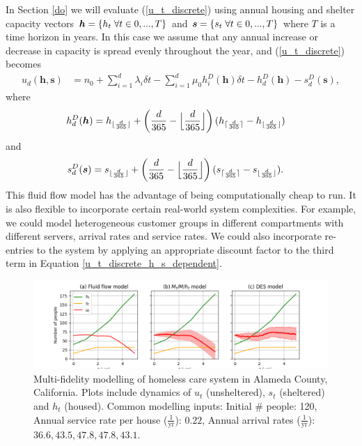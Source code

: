 \documentclass[12pt,a4paper]{article}
\begin{document}
In Section \ref{do} we will evaluate (\ref{u_t_discrete}) using annual housing and shelter capacity vectors $\boldsymbol{h} = \{h_t \hspace{0.1cm} \forall t \in 0,...,T\}$ and $\boldsymbol{s} = \{s_t \hspace{0.1cm} \forall t \in 0,...,T\}$ where $T$ is a time horizon in years. In this case we assume that any annual increase or decrease in capacity is spread evenly throughout the year, and (\ref{u_t_discrete}) becomes
%
\begin{align} \label{u_t_discrete_h_s_dependent}
u_d(\boldsymbol{h},\boldsymbol{s}) & = n_0 + \sum_{i=1}^{d} \lambda_{i} \delta t - \sum_{i=1}^{d} \mu_0 h^D_{i}(\boldsymbol{h}) \delta t - h^D_d(\boldsymbol{h}) - s^D_d(\boldsymbol{s}),
\end{align}
%
where 
%
\begin{align} \label{h_d}
h^D_d(\boldsymbol{h}) & = h_{\lfloor{\frac{d}{365}}\rfloor} + \left( \frac{d}{365} - \Bigl\lfloor\frac{d}{365}\Bigr\rfloor \right)(h_{\lceil{\frac{d}{365}}\rceil}-h_{\lfloor{\frac{d}{365}}\rfloor})
\end{align}
%
and
%
\begin{align} \label{s_d}
s^D_d(\boldsymbol{s}) & = s_{\lfloor{\frac{d}{365}}\rfloor} + \left( \frac{d}{365} - \Bigl\lfloor\frac{d}{365}\Bigr\rfloor \right)(s_{\lceil{\frac{d}{365}}\rceil}-s_{\lfloor{\frac{d}{365}}\rfloor}).
\end{align}
%
This fluid flow model has the advantage of being computationally cheap to run. It is also flexible to incorporate certain real-world system complexities. For example, we could model heterogeneous customer groups in different compartments with different servers, arrival rates and service rates. We could also incorporate re-entries to the system by applying an appropriate discount factor to the third term in Equation \ref{u_t_discrete_h_s_dependent}.
%
\begin{figure}[h!]%
    \centering
    \includegraphics[scale=0.7]{u_t_example.png}
    \caption{Multi-fidelity modelling of homeless care system in Alameda County, California. Plots include dynamics of $u_t$ (unsheltered), $s_t$ (sheltered) and $h_t$ (housed). Common modelling inputs: Initial \# people: 120, Annual service rate per house ($\frac{1}{\text{yr}}$): $0.22$, Annual arrival rates ($\frac{1}{\text{yr}}$): $36.6, 43.5, 47.8, 47.8, 43.1$.}
    \label{fig:ut-illustrative}
\end{figure}
%
\end{document}
